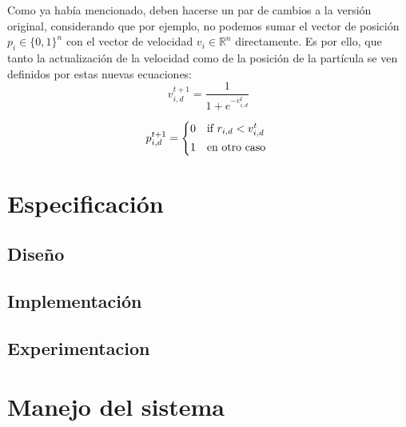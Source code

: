 \documentclass[12pt]{article}
\begin{document}
Como ya había mencionado, deben hacerse un par de cambios a la versión original, considerando que
por ejemplo, no podemos sumar el vector de posición $p_i \in \{0,1\}^n$ con el vector de velocidad
$v_i \in \mathbb{R}^n$ directamente.
Es por ello, que tanto la actualización de la velocidad como de la posición de la partícula se ven definidos por estas nuevas ecuaciones:
\begin{equation}
  v_{i,d}^{t+1} = \frac{1}{1+e^{-v_{i,d}^t}}
\end{equation}

\begin{equation}
  p_{i,d}^{t+1} =
    \begin{cases*}
      0 & if $r_{i,d} < v_{i,d}^{t}$ \\
      1 & en otro caso
    \end{cases*}
\end{equation}

\section{Especificación}
\subsection{Diseño}
\subsection{Implementación}
\subsection{Experimentacion} %
\section{Manejo del sistema} %
\end{document}
